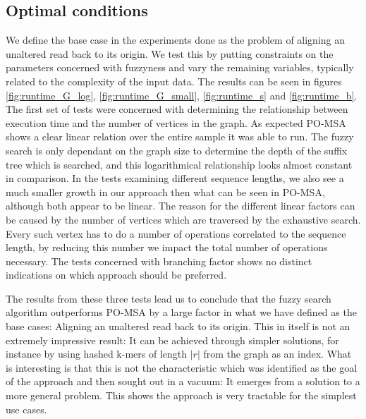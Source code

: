 \documentclass[thesis.tex]{subfiles}
\begin{document}
\subsection*{Optimal conditions}
We define the base case in the experiments done as the problem of aligning an unaltered read back to its origin. We test this by putting constraints on the parameters concerned with fuzzyness and vary the remaining variables, typically related to the complexity of the input data. The results can be seen in figures \ref{fig:runtime_G_log}, \ref{fig:runtime_G_small}, \ref{fig:runtime_s} and \ref{fig:runtime_b}. The first set of tests were concerned with determining the relationship between execution time and the number of vertices in the graph. As expected PO-MSA shows a clear linear relation over the entire sample it was able to run. The fuzzy search is only dependant on the graph size to determine the depth of the suffix tree which is searched, and this logarithmical relationship looks almost constant in comparison. In the tests examining different sequence lengths, we also see a much smaller growth in our approach then what can be seen in PO-MSA, although both appear to be linear. The reason for the different linear factors can be caused by the number of vertices which are traversed by the exhaustive search. Every such vertex has to do a number of operations correlated to the sequence length, by reducing this number we impact the total number of operations necessary. The tests concerned with branching factor shows no distinct indications on which approach should be preferred.\\
\par\noindent
The results from these three tests lead us to conclude that the fuzzy search algorithm outperforms PO-MSA by a large factor in what we have defined as the base cases: Aligning an unaltered read back to its origin. This in itself is not an extremely impressive result: It can be achieved through simpler solutions, for instance by using hashed k-mers of length $|r|$ from the graph as an index. What is interesting is that this is not the characteristic which was identified as the goal of the approach and then sought out in a vacuum: It emerges from a solution to a more general problem. This shows the approach is very tractable for the simplest use cases.
\end{document}
